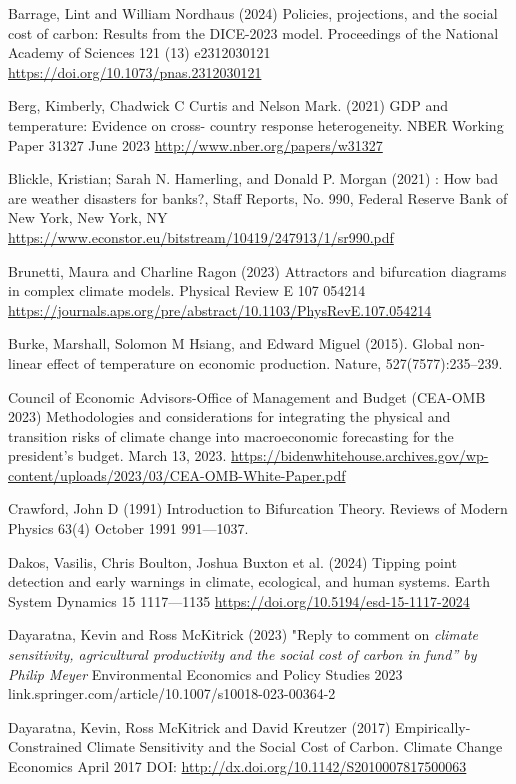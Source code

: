 \documentclass[12pt,paper=a4,DIV=12,parskip=never,chapterprefix=false,headings=standardclasses]{scrreprt}
\begin{document}
Barrage, Lint and William Nordhaus (2024) Policies, projections, and the social cost of carbon: Results
from the DICE-2023 model. Proceedings of the National Academy of Sciences 121 (13) e2312030121
\url{https://doi.org/10.1073/pnas.2312030121}

Berg, Kimberly, Chadwick C Curtis and Nelson Mark. (2021) GDP and temperature: Evidence on cross-
country response heterogeneity. NBER Working Paper 31327 June 2023
\url{http://www.nber.org/papers/w31327}

Blickle, Kristian; Sarah N. Hamerling, and Donald P. Morgan (2021) : How bad are weather disasters for
banks?, Staff Reports, No. 990, Federal Reserve Bank of New York, New York, NY
\url{https://www.econstor.eu/bitstream/10419/247913/1/sr990.pdf}

Brunetti, Maura and Charline Ragon (2023) Attractors and bifurcation diagrams in complex climate models. Physical Review E 107 054214 \url{https://journals.aps.org/pre/abstract/10.1103/PhysRevE.107.054214}

Burke, Marshall, Solomon M Hsiang, and Edward Miguel (2015). Global non-linear effect of temperature
on economic production. Nature, 527(7577):235–239.

Council of Economic Advisors-Office of Management and Budget (CEA-OMB 2023) Methodologies and
considerations for integrating the physical and transition risks of climate change into macroeconomic
forecasting for the president’s budget. March 13, 2023. \url{https://bidenwhitehouse.archives.gov/wp-
content/uploads/2023/03/CEA-OMB-White-Paper.pdf}

Crawford, John D (1991) Introduction to Bifurcation Theory. Reviews of Modern Physics 63(4) October
1991 991—1037.

Dakos, Vasilis, Chris Boulton, Joshua Buxton et al. (2024) Tipping point detection and early warnings in
climate, ecological, and human systems. Earth System Dynamics 15 1117—1135
\url{https://doi.org/10.5194/esd-15-1117-2024}

Dayaratna, Kevin and Ross McKitrick (2023) "Reply to comment on \emph{climate sensitivity, agricultural
productivity and the social cost of carbon in fund” by Philip Meyer} Environmental Economics and
Policy Studies 2023 link.springer.com/article/10.1007/s10018-023-00364-2

Dayaratna, Kevin, Ross McKitrick and David Kreutzer (2017) Empirically-Constrained Climate Sensitivity
and the Social Cost of Carbon. Climate Change Economics April 2017 DOI:
\url{http://dx.doi.org/10.1142/S2010007817500063}
\end{document}
